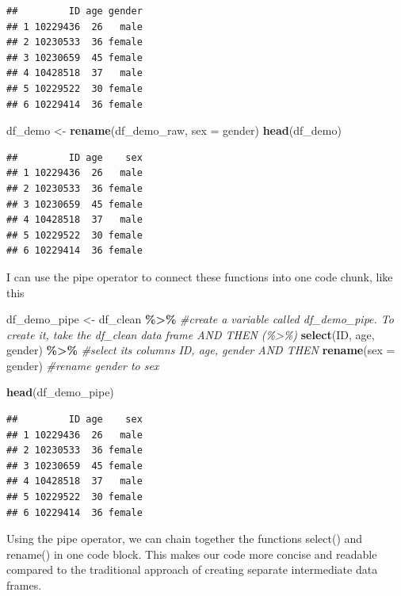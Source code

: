 \documentclass[
]{book}
\newenvironment{Shaded}{\begin{snugshade}}{\end{snugshade}}
\newcommand{\AttributeTok}[1]{\textcolor[rgb]{0.13,0.29,0.53}{#1}}
\newcommand{\CommentTok}[1]{\textcolor[rgb]{0.56,0.35,0.01}{\textit{#1}}}
\newcommand{\FunctionTok}[1]{\textcolor[rgb]{0.13,0.29,0.53}{\textbf{#1}}}
\newcommand{\NormalTok}[1]{#1}
\newcommand{\OtherTok}[1]{\textcolor[rgb]{0.56,0.35,0.01}{#1}}
\newcommand{\SpecialCharTok}[1]{\textcolor[rgb]{0.81,0.36,0.00}{\textbf{#1}}}
\begin{document}
\begin{verbatim}
##         ID age gender
## 1 10229436  26   male
## 2 10230533  36 female
## 3 10230659  45 female
## 4 10428518  37   male
## 5 10229522  30 female
## 6 10229414  36 female
\end{verbatim}

\begin{Shaded}
\begin{Highlighting}[]
\NormalTok{df\_demo }\OtherTok{\textless{}{-}} \FunctionTok{rename}\NormalTok{(df\_demo\_raw, }\AttributeTok{sex =}\NormalTok{ gender)}
\FunctionTok{head}\NormalTok{(df\_demo)}
\end{Highlighting}
\end{Shaded}

\begin{verbatim}
##         ID age    sex
## 1 10229436  26   male
## 2 10230533  36 female
## 3 10230659  45 female
## 4 10428518  37   male
## 5 10229522  30 female
## 6 10229414  36 female
\end{verbatim}

I can use the pipe operator to connect these functions into one code chunk, like this

\begin{Shaded}
\begin{Highlighting}[]
\NormalTok{df\_demo\_pipe }\OtherTok{\textless{}{-}}\NormalTok{ df\_clean }\SpecialCharTok{\%\textgreater{}\%} \CommentTok{\#create a variable called df\_demo\_pipe. To create it, take the df\_clean data frame AND THEN (\%\textgreater{}\%)}
  \FunctionTok{select}\NormalTok{(ID, age, gender) }\SpecialCharTok{\%\textgreater{}\%}  \CommentTok{\#select its columns ID, age, gender AND THEN}
  \FunctionTok{rename}\NormalTok{(}\AttributeTok{sex =}\NormalTok{ gender) }\CommentTok{\#rename gender to sex}

\FunctionTok{head}\NormalTok{(df\_demo\_pipe)}
\end{Highlighting}
\end{Shaded}

\begin{verbatim}
##         ID age    sex
## 1 10229436  26   male
## 2 10230533  36 female
## 3 10230659  45 female
## 4 10428518  37   male
## 5 10229522  30 female
## 6 10229414  36 female
\end{verbatim}

Using the pipe operator, we can chain together the functions select() and rename() in one code block. This makes our code more concise and readable compared to the traditional approach of creating separate intermediate data frames.
\end{document}
